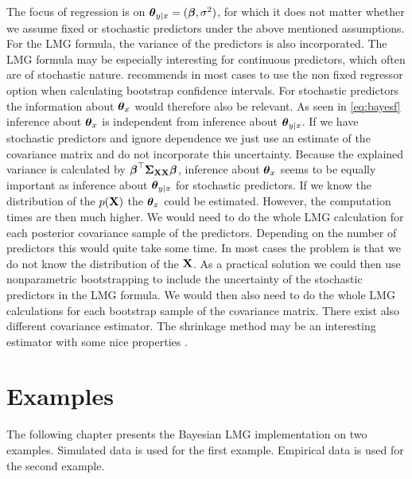 \documentclass[11pt,a4paper,twoside]{book}\usepackage[]{graphicx}\usepackage[]{color}
\begin{document}
  The focus of regression is on ${\boldsymbol{\theta}}{}_{y \mid x} = ({\boldsymbol{\beta}}, \sigma^2)$, for which it does not matter whether we assume fixed or stochastic predictors under the above mentioned assumptions. For the LMG formula, the variance of the predictors is also incorporated. The LMG formula may be especially interesting for continuous predictors, which often are of stochastic nature. \cite{Gromping2006} recommends in most cases to use the non fixed regressor option when calculating bootstrap confidence intervals. For stochastic predictors the information about ${\boldsymbol{\theta}}{}_{x}$ would therefore also be relevant.  As seen in \eqref{eq:bayesf} inference about ${\boldsymbol{\theta}}{}_{x}$  is independent from inference about ${\boldsymbol{\theta}}{}_{y \mid x}$. If we have stochastic predictors and ignore dependence we just use an estimate of the covariance matrix and do not incorporate this uncertainty.  Because the explained variance is calculated by ${\boldsymbol{\beta}}^\top {\boldsymbol{\Sigma}}{}_{{\mathbf{X}} {\mathbf{X}}}  {\boldsymbol{\beta}}$, inference about  ${\boldsymbol{\theta}}{}_{x}$  seems to be equally important as inference about ${\boldsymbol{\theta}}{}_{y \mid x}$ for stochastic predictors. If we know the distribution of the $p({\mathbf{X}})$ the ${\boldsymbol{\theta}}{}_{x}$ could be estimated. However, the computation times are then much higher. We would need to do the whole LMG calculation for each posterior covariance sample of the predictors. Depending on the number of predictors this would quite take some time.  In most cases the problem is that we do not know the distribution of the ${\mathbf{X}}$. As a practical solution we could then use nonparametric bootstrapping to include the uncertainty of the stochastic predictors in the LMG formula. We would then also need to do the whole LMG calculations for each bootstrap sample of the covariance matrix. There exist also different covariance estimator. The shrinkage method may be an interesting estimator with some nice properties \citep{Schafer2005}. 
  
  
  
 









\chapter{Examples}

The following chapter presents the Bayesian LMG implementation on two examples. Simulated data is used for the first example. Empirical data is used for the second example.
\end{document}

